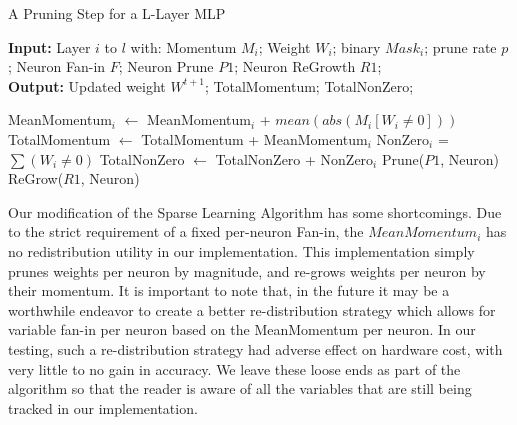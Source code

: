 


\begin{algorithm}
\caption{A Pruning Step for a L-Layer MLP}
 \hspace*{\algorithmicindent} \textbf{Input:} Layer $i$ to $l$ with: Momentum $M_{i}$; Weight $W_{i}$; binary $Mask_{i}$; prune rate $p$; Neuron Fan-in $F$; Neuron Prune $P1$; Neuron ReGrowth $R1$;\\
 \hspace*{\algorithmicindent} \textbf{Output:} Updated weight $W^{t+1}$; TotalMomentum; TotalNonZero;
\begin{algorithmic}[1]
    \State MeanMomentum$_{i}$ $\leftarrow$ MeanMomentum$_{i}$ + $mean(abs(M_{i}[W_{i}\neq0]))$
    \State TotalMomentum $\leftarrow$ TotalMomentum + MeanMomentum$_{i}$
    \State NonZero$_{i}$ = $\sum(W_{i}\neq0)$
    \State TotalNonZero $\leftarrow$ TotalNonZero + NonZero$_{i}$
\EndFor
{}
        \State Prune($P1$, Neuron)
        \State ReGrow($R1$, Neuron)
\EndFor
\EndFor
\end{algorithmic}
\label{algorithm1}
\end{algorithm}


Our modification of the Sparse Learning Algorithm has some shortcomings. Due to the strict requirement of a fixed per-neuron Fan-in, the $MeanMomentum_{i}$ has no redistribution utility in our implementation. This implementation simply prunes weights per neuron by magnitude, and re-grows weights per neuron by their momentum. It is important to note that, in the future it may be a worthwhile endeavor to create a better re-distribution strategy which allows for variable fan-in per neuron based on the MeanMomentum per neuron. In our testing, such a re-distribution strategy had adverse effect on hardware cost, with very little to no gain in accuracy. We leave these loose ends as part of the algorithm so that the reader is aware of all the variables that are still being tracked in our implementation. 

